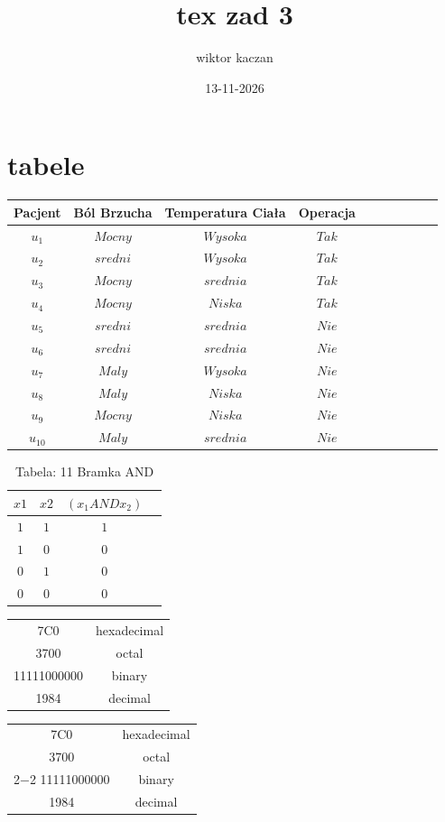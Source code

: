 \documentclass{article}
\title{tex zad 3}
\author{wiktor kaczan}
\date{13-11-2026}
\begin{document}
\maketitle

\section{tabele}

\begin{tabular}{c|c|c|c|c|c|c|c|c|c}
     \hline
     Pacjent & Ból Brzucha & Temperatura Ciała & Operacja \\
     \hline
     $u_1$ & $Mocny$ & $Wysoka$ & $Tak$ \\
     $u_2$ & $sredni$ & $Wysoka$ & $Tak$ \\
     $u_3$ & $Mocny$ & $srednia$ & $Tak$ \\
     $u_4$ & $Mocny$ & $Niska$ & $Tak$ \\
     $u_5$ & $sredni$ & $srednia$ & $Nie$ \\
     $u_6$ & $sredni$ & $srednia$ & $Nie$ \\
     $u_7$ & $Maly$ & $Wysoka$ & $Nie$ \\
     $u_8$ & $Maly$ & $Niska$ & $Nie$ \\
     $u_9$ & $Mocny$ & $Niska$ & $Nie$ \\
     $u_{10}$ & $Maly$ & $srednia$ & $Nie$\\
     \hline
\end{tabular}







\begin{table}
\centering \caption{Tabela: 11 Bramka AND}
\begin{tabular}{|c|c|c|c|}
\hline
$x1$ & $x2$ & $(x_1ANDx_2)$ \\
\hline
         $1$ & $1$ & $1$ \\
         $1$ & $0$ & $0$ \\
         $0$ & $1$ & $0$ \\
         $0$ & $0$ & $0$ \\
\hline
\end{tabular}
\end{table}



\begin{tabular}{|c|c|}
     \hline
     7C0 & hexadecimal \\
     3700 & octal \\
     11111000000 & binary \\
     \hline
     \hline
     1984 & decimal \\
     \hline
\end{tabular}

\begin{tabular}{|c|c|}
    \hline
    7C0 & hexadecimal \\
    3700 & octal \\ \cline{2−2}
    11111000000 & binary \\
    \hline \hline
    1984 & decimal \\
    \hline
\end{tabular}
\end{document}
